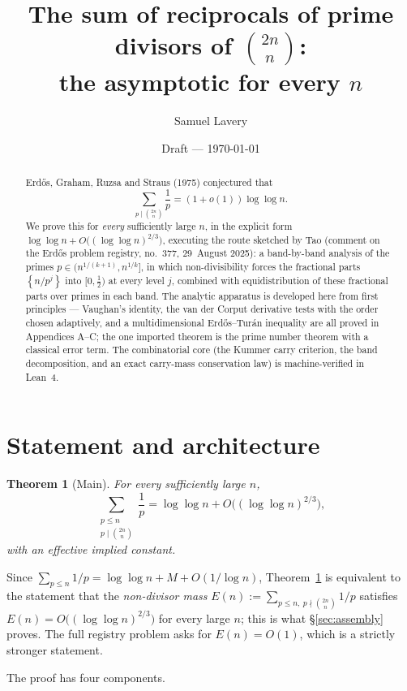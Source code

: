 \documentclass[11pt]{article}
\title{The sum of reciprocals of prime divisors of $\binom{2n}{n}$:\\
the asymptotic for every $n$}
\author{Samuel Lavery}
\date{Draft --- \today}
\newtheorem{theorem}{Theorem}
\theoremstyle{definition}
\theoremstyle{plain}
\newcommand{\fpart}[1]{\left\{#1\right\}}
\begin{document}
\maketitle

\begin{abstract}
Erd\H{o}s, Graham, Ruzsa and Straus (1975) conjectured that
\[
\sum_{p\mid\binom{2n}{n}}\frac1p=(1+o(1))\log\log n .
\]
We prove this for
\emph{every} sufficiently large $n$, in the explicit form
$\log\log n+O\bigl((\log\log n)^{2/3}\bigr)$, executing the route
sketched by Tao (comment on the Erd\H{o}s problem registry, no.~377,
29~August 2025): a band-by-band analysis of the primes
$p\in(n^{1/(k+1)},n^{1/k}]$, in which non-divisibility forces the fractional
parts $\fpart{n/p^j}$ into $[0,\tfrac12)$ at every level $j$, combined with
equidistribution of these fractional parts over primes in each band.  The
analytic apparatus is developed here from first principles --- Vaughan's
identity, the van der Corput derivative tests with the order chosen
adaptively, and a multidimensional Erd\H{o}s--Tur\'an inequality are all
proved in Appendices A--C; the one imported theorem is the prime number
theorem with a classical error term.  The combinatorial core (the Kummer
carry criterion, the band decomposition, and an exact carry-mass
conservation law) is machine-verified in Lean~4.
\end{abstract}

\section{Statement and architecture}

\begin{theorem}[Main]\label{thm:main}
For every sufficiently large $n$,
\[
\sum_{\substack{p\le n\\ p\mid\binom{2n}{n}}}\frac1p
=\log\log n+O\bigl((\log\log n)^{2/3}\bigr),
\]
with an effective implied constant.
\end{theorem}

Since $\sum_{p\le n}1/p=\log\log n+M+O(1/\log n)$, Theorem~\ref{thm:main}
is equivalent to the statement that the \emph{non-divisor mass}
$E(n):=\sum_{p\le n,\ p\nmid\binom{2n}{n}}1/p$ satisfies
$E(n)=O\bigl((\log\log n)^{2/3}\bigr)$ for every large $n$; this is what
\S\ref{sec:assembly} proves.  The full registry problem asks for
$E(n)=O(1)$, which is a strictly stronger statement.

The proof has four components.
\end{document}
